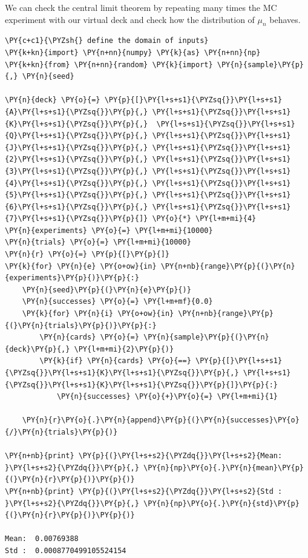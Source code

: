 We can check the central limit theorem by repeating many times the
MC experiment with our virtual deck and check how the distribution of $\mu_n$ behaves.

\begin{tcolorbox}[breakable, size=fbox, boxrule=1pt, pad at break*=1mm,colback=cellbackground, colframe=cellborder]
\begin{Verbatim}[commandchars=\\\{\}]
\PY{c+c1}{\PYZsh{} define the domain of inputs}
\PY{k+kn}{import} \PY{n+nn}{numpy} \PY{k}{as} \PY{n+nn}{np}
\PY{k+kn}{from} \PY{n+nn}{random} \PY{k}{import} \PY{n}{sample}\PY{p}{,} \PY{n}{seed}
	
\PY{n}{deck} \PY{o}{=} \PY{p}{[}\PY{l+s+s1}{\PYZsq{}}\PY{l+s+s1}{A}\PY{l+s+s1}{\PYZsq{}}\PY{p}{,} \PY{l+s+s1}{\PYZsq{}}\PY{l+s+s1}{K}\PY{l+s+s1}{\PYZsq{}}\PY{p}{,}  \PY{l+s+s1}{\PYZsq{}}\PY{l+s+s1}{Q}\PY{l+s+s1}{\PYZsq{}}\PY{p}{,} \PY{l+s+s1}{\PYZsq{}}\PY{l+s+s1}{J}\PY{l+s+s1}{\PYZsq{}}\PY{p}{,} \PY{l+s+s1}{\PYZsq{}}\PY{l+s+s1}{2}\PY{l+s+s1}{\PYZsq{}}\PY{p}{,} \PY{l+s+s1}{\PYZsq{}}\PY{l+s+s1}{3}\PY{l+s+s1}{\PYZsq{}}\PY{p}{,} \PY{l+s+s1}{\PYZsq{}}\PY{l+s+s1}{4}\PY{l+s+s1}{\PYZsq{}}\PY{p}{,} \PY{l+s+s1}{\PYZsq{}}\PY{l+s+s1}{5}\PY{l+s+s1}{\PYZsq{}}\PY{p}{,} \PY{l+s+s1}{\PYZsq{}}\PY{l+s+s1}{6}\PY{l+s+s1}{\PYZsq{}}\PY{p}{,} \PY{l+s+s1}{\PYZsq{}}\PY{l+s+s1}{7}\PY{l+s+s1}{\PYZsq{}}\PY{p}{]} \PY{o}{*} \PY{l+m+mi}{4}
\PY{n}{experiments} \PY{o}{=} \PY{l+m+mi}{10000}
\PY{n}{trials} \PY{o}{=} \PY{l+m+mi}{10000}
\PY{n}{r} \PY{o}{=} \PY{p}{[}\PY{p}{]}
\PY{k}{for} \PY{n}{e} \PY{o+ow}{in} \PY{n+nb}{range}\PY{p}{(}\PY{n}{experiments}\PY{p}{)}\PY{p}{:}
    \PY{n}{seed}\PY{p}{(}\PY{n}{e}\PY{p}{)}
    \PY{n}{successes} \PY{o}{=} \PY{l+m+mf}{0.0}
    \PY{k}{for} \PY{n}{i} \PY{o+ow}{in} \PY{n+nb}{range}\PY{p}{(}\PY{n}{trials}\PY{p}{)}\PY{p}{:}
        \PY{n}{cards} \PY{o}{=} \PY{n}{sample}\PY{p}{(}\PY{n}{deck}\PY{p}{,} \PY{l+m+mi}{2}\PY{p}{)}
        \PY{k}{if} \PY{n}{cards} \PY{o}{==} \PY{p}{[}\PY{l+s+s1}{\PYZsq{}}\PY{l+s+s1}{K}\PY{l+s+s1}{\PYZsq{}}\PY{p}{,} \PY{l+s+s1}{\PYZsq{}}\PY{l+s+s1}{K}\PY{l+s+s1}{\PYZsq{}}\PY{p}{]}\PY{p}{:}
            \PY{n}{successes} \PY{o}{+}\PY{o}{=} \PY{l+m+mi}{1}
	
    \PY{n}{r}\PY{o}{.}\PY{n}{append}\PY{p}{(}\PY{n}{successes}\PY{o}{/}\PY{n}{trials}\PY{p}{)}
	
\PY{n+nb}{print} \PY{p}{(}\PY{l+s+s2}{\PYZdq{}}\PY{l+s+s2}{Mean: }\PY{l+s+s2}{\PYZdq{}}\PY{p}{,} \PY{n}{np}\PY{o}{.}\PY{n}{mean}\PY{p}{(}\PY{n}{r}\PY{p}{)}\PY{p}{)}
\PY{n+nb}{print} \PY{p}{(}\PY{l+s+s2}{\PYZdq{}}\PY{l+s+s2}{Std : }\PY{l+s+s2}{\PYZdq{}}\PY{p}{,} \PY{n}{np}\PY{o}{.}\PY{n}{std}\PY{p}{(}\PY{n}{r}\PY{p}{)}\PY{p}{)}

Mean:  0.00769388
Std :  0.0008770499105524154
\end{Verbatim}
\end{tcolorbox}


